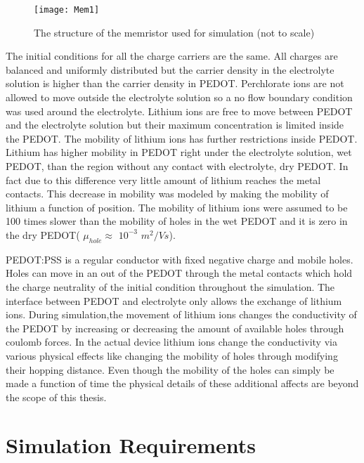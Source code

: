 \begin{doublespace}
\begin{figure}[!htp]
\centering
\texttt{[image: Mem1]}
\caption{The structure of the memristor used for simulation (not to scale)} 
\label{MemStc}
\end{figure}



The initial conditions for all the charge carriers are the same. All charges are balanced and uniformly distributed but the carrier density in the electrolyte solution is higher than the carrier density in PEDOT. Perchlorate ions are not allowed to move outside the electrolyte solution so a no flow boundary condition was used around the electrolyte. Lithium ions are free to move between PEDOT and the electrolyte solution but their maximum concentration is limited inside the PEDOT. The mobility of lithium ions has further restrictions inside PEDOT. Lithium has higher mobility in PEDOT right under the electrolyte solution, wet PEDOT, than the region without any contact with electrolyte, dry PEDOT. In fact due to this difference very little amount of lithium reaches the metal contacts. This decrease in mobility was modeled by making the mobility of lithium a function of position. The mobility of lithium ions were assumed to be 100 times slower than the mobility of holes in the wet PEDOT and it is zero in the dry PEDOT( $\mu_{hole} \approx$ $10^{-3}$ $m^2/Vs$). 

 


PEDOT:PSS is a regular conductor with fixed negative charge and mobile holes. Holes can move in an out of the PEDOT through the metal contacts which hold the charge neutrality of the initial condition throughout the simulation. The interface between PEDOT and electrolyte only allows the exchange of lithium ions. During simulation,the movement of lithium ions changes the conductivity of the PEDOT by increasing or decreasing the amount of available holes through coulomb forces. In the actual device lithium ions change the conductivity via various physical effects like changing the mobility of holes through modifying their hopping distance. Even though the mobility of the holes can simply be made a function of time the physical details of these additional affects are beyond the scope of this thesis. 




\clearpage
\section{Simulation Requirements}


\end{doublespace}
